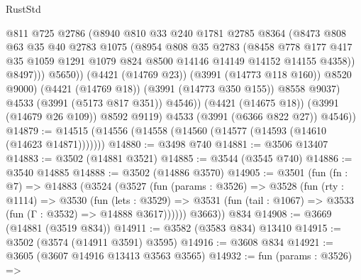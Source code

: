 \begin{lexlean}{RustStd}
\begin{coremodule}
                        @811
                        @725
                        @2786
                        (@8940
                          @810
                          @33
                          @240
                          @1781
                          @2785
                          @8364
                          (@8473
                            @808
                            @63
                            @35
                            @40
                            @2783
                            @1075
                            (@8954
                              @808
                              @35
                              @2783
                              (@8458
                                @778
                                @177
                                @417
                                @35
                                @1059
                                @1291
                                @1079
                                @824
                                @8500
                                @14146
                                @14149
                                @14152
                                @14155
                                @4358))
                            @8497)))
                      @5650))
                  (@4421 (@14769 @23))
                  (@3991 (@14773 @118 @160))
                  @8520
                  @9000)
                (@4421 (@14769 @18))
                (@3991 (@14773 @350 @155))
                @8558
                @9037)
              @4533
              (@3991 (@5173 @817 @351))
              @4546))
          (@4421 (@14675 @18))
          (@3991 (@14679 @26 @109))
          @8592
          @9119)
        @4533
        (@3991 (@6366 @822 @27))
        @4546))
@14879 := @14515 (@14556 (@14558 (@14560 (@14577 (@14593 (@14610 (@14623 @14871)))))))
@14880 := @3498 @740
@14881 := @3506 @13407
@14883 := @3502 (@14881 @3521)
@14885 := @3544 (@3545 @740)
@14886 := @3540 @14885
@14888 := @3502 (@14886 @3570)
@14905 := @3501
    (fun (fn : @7) =>
    @14883
      (@3524
        (@3527
          (fun (params : @3526) =>
          @3528
            (fun (rty : @1114) =>
            @3530
              (fun (lets : @3529) =>
              @3531 (fun (tail : @1067) => @3533 (fun (Γ : @3532) => @14888 @3617))))))
        @3663))
    @834
@14908 := @3669 (@14881 (@3519 @834))
@14911 := @3582 (@3583 @834) @13410
@14915 := @3502 (@3574 (@14911 @3591) @3595)
@14916 := @3608 @834
@14921 := @3605 (@3607 @14916 @13413 @3563 @3565)
@14932 := fun (params : @3526) =>

\end{coremodule}
\end{lexlean}
